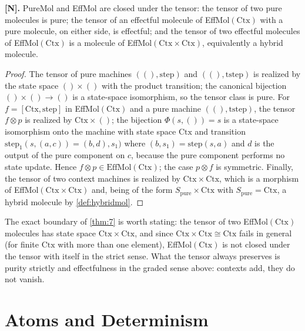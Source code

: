 \begin{theorem}\label{thm:7}
\textbf{[N].} PureMol and EffMol are closed under the tensor: the tensor of
two pure molecules is pure; the tensor of an effectful molecule of
EffMol$(\mathrm{Ctx})$ with a pure molecule, on either side, is effectful;
and the tensor of two effectful molecules of EffMol$(\mathrm{Ctx})$ is a
molecule of EffMol$(\mathrm{Ctx} \times \mathrm{Ctx})$, equivalently a hybrid
molecule.
\end{theorem}

\begin{proof}
The tensor of pure machines $((), \mathrm{step})$ and
$((), \mathrm{tstep})$ is realized by the state space $() \times ()$ with the
product transition; the canonical bijection $() \times () \to ()$ is a
state-space isomorphism, so the tensor class is pure. For
$f = [\mathrm{Ctx}, \mathrm{step}]$ in EffMol$(\mathrm{Ctx})$ and a pure
machine $((), \mathrm{tstep})$, the tensor $f \otimes p$ is realized by
$\mathrm{Ctx} \times ()$; the bijection $\Phi (s, ()) = s$ is a state-space
isomorphism onto the machine with state space $\mathrm{Ctx}$ and transition
$\mathrm{step}_1 (s, (a, c)) = (b, d), s_1)$ where $(b, s_1) =
\mathrm{step} (s, a)$ and $d$ is the output of the pure component on $c$,
because the pure component performs no state update. Hence
$f \otimes p \in \mathrm{EffMol} (\mathrm{Ctx})$; the case $p \otimes f$ is
symmetric. Finally, the tensor of two context machines is realized by
$\mathrm{Ctx} \times \mathrm{Ctx}$, which is a morphism of
EffMol$(\mathrm{Ctx} \times \mathrm{Ctx})$ and, being of the form
$S_{\mathrm{pure}} \times \mathrm{Ctx}$ with $S_{\mathrm{pure}} =
\mathrm{Ctx}$, a hybrid molecule by \autoref{def:hybridmol}.
\end{proof}

\begin{remark}
The exact boundary of \autoref{thm:7} is worth stating: the tensor of two
EffMol$(\mathrm{Ctx})$ molecules has state space $\mathrm{Ctx} \times
\mathrm{Ctx}$, and since $\mathrm{Ctx} \times \mathrm{Ctx} \cong \mathrm{Ctx}$
fails in general (for finite $\mathrm{Ctx}$ with more than one element),
EffMol$(\mathrm{Ctx})$ is not closed under the tensor with itself in the
strict sense. What the tensor always preserves is purity strictly and
effectfulness in the graded sense above: contexts add, they do not vanish.
\end{remark}

\section{Atoms and Determinism}\label{sec:mol-atoms}

